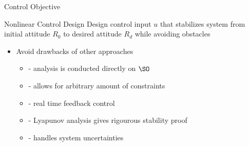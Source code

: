 \begin{frame}{Control Objective} %

    \begin{block}{Nonlinear Control Design}
        Design control input \( u \) that stabilizes system from initial attitude \( R_0 \) to desired attitude \( R_d \) while avoiding obstacles
    \end{block}
    \pause
    \vs
    \begin{itemize}
        \item Avoid drawbacks of other approaches 
        \begin{itemize}
            \item {} - analysis is conducted directly on \( \SO \) 
            \item {} - allows for arbitrary amount of constraints
            \item {} - real time feedback control
            \item {} - Lyapunov analysis gives rigourous stability proof
            \item {} - handles system uncertainties
        \end{itemize}
    \end{itemize}
\end{frame}

